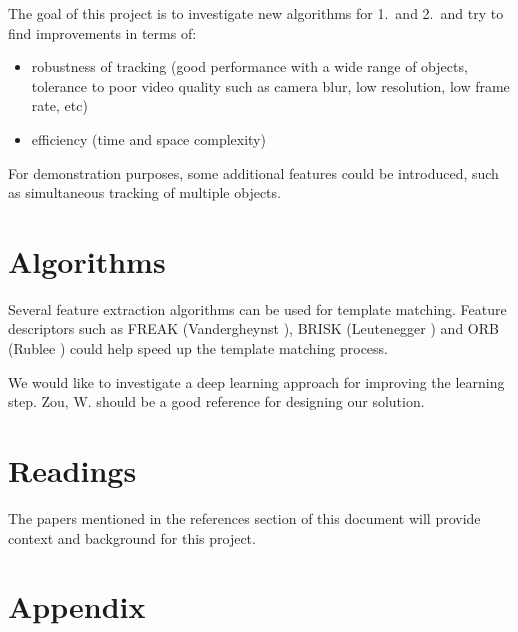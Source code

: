\documentclass[11pt,letterpaper]{article}
\begin{document}
The goal of this project is to investigate new algorithms for 1.\ and 2.\ and try to find improvements in terms of:
\begin{itemize}
\item
robustness of tracking (good performance with a wide range of objects, tolerance to poor video quality such as camera blur, low resolution, low frame rate, etc)
\item
efficiency (time and space complexity)
\end{itemize}
For demonstration purposes, some additional features could be introduced, such as simultaneous tracking of multiple objects.

\section{Algorithms}

Several feature extraction algorithms can be used for template matching. Feature descriptors such as FREAK (Vandergheynst \cite{vandergheynst2012freak}), BRISK (Leutenegger \cite{leutenegger2011brisk}) and ORB (Rublee  \cite{rublee2011orb}) could help speed up the template matching process.

We would like to investigate a deep learning approach for improving the learning step. Zou, W. \cite{zou} should be a good reference for designing our solution.


\section{Readings}

The papers mentioned in the references section of this document will provide context and background for this project.





\section{Appendix}
\end{document}
